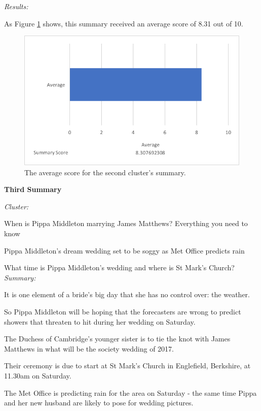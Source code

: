 \documentclass[12pt]{article}
\begin{document}
\emph{Results:}

As Figure \ref{summ2} shows, this summary received an average score of 8.31 out of 10. \\

\begin{figure}[ht!]
  \centering
    \includegraphics[scale=0.7]{summ2score.png}
   \caption[The average score for a summary]{The average score for the second cluster's summary.}
   \label{summ2}
\end{figure} 

\textbf{Third Summary}

\emph{Cluster:}

When is Pippa Middleton marrying James Matthews? Everything you need to know

Pippa Middleton's dream wedding set to be soggy as Met Office predicts rain

What time is Pippa Middleton's wedding and where is St Mark's Church? \\

\emph{Summary:}

It is one element of a bride's big day that she has no control over: the weather.

So Pippa Middleton will be hoping that the forecasters are wrong to predict showers that threaten to hit during her wedding on Saturday.

The Duchess of Cambridge's younger sister is to tie the knot with James Matthews in what will be the society wedding of 2017.

Their ceremony is due to start at St Mark's Church in Englefield, Berkshire, at 11.30am on Saturday.

The Met Office is predicting rain for the area on Saturday - the same time Pippa and her new husband are likely to pose for wedding pictures.
\end{document}
